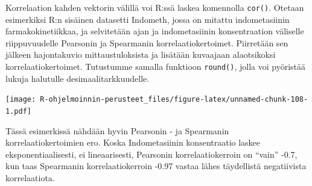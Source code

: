 \documentclass[
]{book}
\newenvironment{Shaded}{\begin{snugshade}}{\end{snugshade}}
\newcommand{\AttributeTok}[1]{\textcolor[rgb]{0.77,0.63,0.00}{#1}}
\newcommand{\CommentTok}[1]{\textcolor[rgb]{0.56,0.35,0.01}{\textit{#1}}}
\newcommand{\DecValTok}[1]{\textcolor[rgb]{0.00,0.00,0.81}{#1}}
\newcommand{\FunctionTok}[1]{\textcolor[rgb]{0.00,0.00,0.00}{#1}}
\newcommand{\NormalTok}[1]{#1}
\newcommand{\OtherTok}[1]{\textcolor[rgb]{0.56,0.35,0.01}{#1}}
\newcommand{\SpecialCharTok}[1]{\textcolor[rgb]{0.00,0.00,0.00}{#1}}
\newcommand{\StringTok}[1]{\textcolor[rgb]{0.31,0.60,0.02}{#1}}
\begin{document}
Korrelaation kahden vektorin välillä voi R:ssä laskea komennolla \texttt{cor()}. Otetaan esimerkiksi R:n sisäinen datasetti Indometh, jossa on mitattu indometasiinin farmakokinetiikkaa, ja selvitetään ajan ja indometasiinin konsentraation väliselle riippuvuudelle Pearsonin ja Spearmanin korrelaatiokertoimet. Piirretään sen jälkeen hajontakuvio mittaustuloksista ja lisätään kuvaajaan alaotsikoksi korrelaatiokertoimet. Tutustumme samalla funktioon \texttt{round()}, jolla voi pyöristää lukuja halutulle desimaalitarkkuudelle.

\begin{Shaded}
\end{Shaded}

\texttt{[image: R-ohjelmoinnin-perusteet\_files/figure-latex/unnamed-chunk-108-1.pdf]}

Tässä esimerkissä nähdään hyvin Pearsonin - ja Spearmanin korrelaatiokertoimien ero. Koska Indometasiinin konsentraatio laskee eksponentiaalisesti, ei lineaarisesti, Pearsonin korrelaatiokerroin on ``vain'' -0.7, kun taas Spearmanin korrelaatiokerroin -0.97 vastaa lähes täydellistä negatiivista korrelaatiota.
\end{document}
